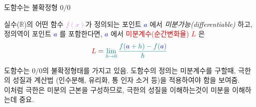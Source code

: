 \documentclass[aspectratio=169]{beamer}
\begin{document}
\begin{frame}{도함수는 불확정형 $ 0 / 0 $}
  \begin{definition}[도함수]
    실수($\mathbb{R}$)의 어떤 함수 \textcolor{violet}{$f(x)$}가 정의되는 포인트 \textcolor{blue}{\emph{$a$}} 에서 \emph{미분가능(differentiable)} 하고, 정의역이 포인트 \textcolor{blue}{\emph{$a$}} 를 포함한다면, \textcolor{blue}{\emph{$a$}} 에서 \textcolor{red}{미분계수(순간변화율)} \textcolor{red}{\emph{$L$}} 은 \\
    \begin{equation}
      \textcolor{red}{L} = \textcolor{teal}{\lim_{h \to 0} \frac{f(\textcolor{blue}{a}+h)-f(\textcolor{blue}{a})}{h}}
    \end{equation}
  \end{definition}
  \vspace{10pt}
  도함수는 \textbf{$0/0$}의 불확정형태를 가지고 있음. 도함수의 정의는 미분계수를 구할때, 극한의 성질과 계산법 (인수분해, 유리화, 통 인자 소거 등)을 적용하여야 함을 보여줌. \\
  이처럼 극한은 미분의 근본을 구성하므로, 극한의 성질을 이해하는것이 미분을 이해하는데 중요. 
\end{frame}
\end{document}
